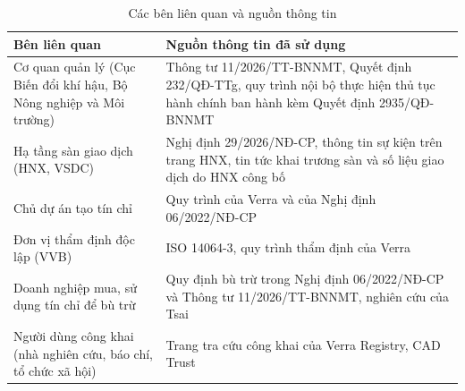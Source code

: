 \begin{table}[htbp]
    \centering
    \caption{Các bên liên quan và nguồn thông tin}
    \label{tab:ks-doituong}
    \small
    \renewcommand{\arraystretch}{1.2}
    \begin{tabularx}{\textwidth}{|p{4.2cm}|X|}
        \hline
        \textbf{Bên liên quan} & \textbf{Nguồn thông tin đã sử dụng} \\
        \hline
        Cơ quan quản lý (Cục Biến đổi khí hậu, Bộ Nông nghiệp và Môi trường) & Thông tư 11/2026/TT-BNNMT, Quyết định 232/QĐ-TTg, quy trình nội bộ thực hiện thủ tục hành chính ban hành kèm Quyết định 2935/QĐ-BNNMT~\cite{vietnam2026thongtu11} \cite{vietnam2025qd232} \cite{mae2025qd2935} \\
        \hline
        Hạ tầng sàn giao dịch (HNX, VSDC) & Nghị định 29/2026/NĐ-CP, thông tin sự kiện trên trang HNX, tin tức khai trương sàn và số liệu giao dịch do HNX công bố~\cite{vietnam2026nghidinh29} \cite{hnx2026vn2025} \cite{dbnd2026santhuong} \cite{dantri2026san3thang} \\
        \hline
        Chủ dự án tạo tín chỉ & Quy trình của Verra và của Nghị định 06/2022/NĐ-CP~\cite{verra2024vcs} \cite{vietnam2022nghidinh06} \\
        \hline
        Đơn vị thẩm định độc lập (VVB) & ISO 14064-3, quy trình thẩm định của Verra~\cite{iso14064-3} \cite{verra2024projecthub} \\
        \hline
        Doanh nghiệp mua, sử dụng tín chỉ để bù trừ & Quy định bù trừ trong Nghị định 06/2022/NĐ-CP và Thông tư 11/2026/TT-BNNMT, nghiên cứu của Tsai~\cite{vietnam2025nghidinh119} \cite{vietnam2026thongtu11} \cite{tsai2024blockchain} \\
        \hline
        Người dùng công khai (nhà nghiên cứu, báo chí, tổ chức xã hội) & Trang tra cứu công khai của Verra Registry, CAD Trust~\cite{verraregistry} \cite{verra2020registryv2} \cite{cadtrust2025datamodel} \\
        \hline
    \end{tabularx}
\end{table}


